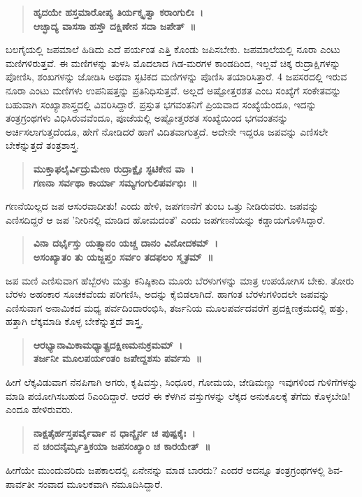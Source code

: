 {\begin{verse}
\textbf{ಹೃದಯೇ ಹಸ್ತಮಾರೋಪ್ಯ ತಿರ್ಯಕ್ಕೃತ್ವಾ ಕರಾಂಗುಲಿಃ~। \\
ಆಚ್ಛಾದ್ಯ ವಾಸಸಾ ಹಸ್ತೌ ದಕ್ಷಿಣೇನ ಸದಾ ಜಪೇತ್~॥}
\end{verse}
ಬಲಗೈಯಲ್ಲಿ ಜಪಮಾಲೆ ಹಿಡಿದು ಎದೆ ಪರ್ಯಂತ ಎತ್ತಿ ಕೊಂಡು ಜಪಿಸಬೇಕು. ಜಪಮಾಲೆಯಲ್ಲಿ ನೂರಾ ಎಂಟು ಮಣಿಗಳಿರುತ್ತವೆ. ಈ ಮಣಿಗಳನ್ನು ತುಳಸಿ ಮೊದಲಾದ ಗಿಡ-ಮರಗಳ ಕಾಂಡದಿಂದ, ಇಲ್ಲವೆ ಚಿಕ್ಕ ರುದ್ರಾಕ್ಷಿಗಳನ್ನು ಪೋಣಿಸಿ, ಶಂಖಗಳನ್ನು ಜೋಡಿಸಿ ಅಥವಾ ಸ್ಫಟಿಕದ ಮಣಿಗಳನ್ನು ಪೊಣಿಸಿ ತಯಾರಿಸಿತ್ತಾರೆ. 4 ಜಪಸರದಲ್ಲಿ ಇರುವ ನೂರಾ ಎಂಟು ಮಣಿಗಳು ಉಪನಿಷತ್ತನ್ನು ಪ್ರತಿನಿಧಿಸುತ್ತವೆ. ಅಲ್ಲದೆ ಅಷ್ಟೋತ್ತರಶತ ಎಂಬ ಸಂಖ್ಯೆಗೆ ಸಂಕೇತವನ್ನು ಬಹುವಾಗಿ ಸಂಖ್ಯಾಶಾಸ್ತ್ರದಲ್ಲಿ ವಿವರಿಸಿದ್ದಾರೆ. ಪ್ರಸ್ತುತ ಭಗವಂತನಿಗೆ ಪ್ರಿಯವಾದ ಸಂಖ್ಯೆಯೆಂದೂ, ಇದನ್ನು ತಂತ್ರಗ್ರಂಥಗಳು ವಿಧಿಸಿರುವವೆಂದೂ, ಪೂಜೆಯಲ್ಲಿ ಅಷ್ಟೋತ್ತರಶತ ಸಂಖ್ಯೆಯಿಂದ ಭಗವಂತನನ್ನು ಅರ್ಚಿಸಲಾಗುತ್ತದೆಂದೂ, ಹೇಗೆ ನೋಡಿದರೆ ಹಾಗೆ ವಿದಿತವಾಗುತ್ತದೆ. ಅದೇನೇ ಇದ್ದರೂ ಜಪವನ್ನು ಎಣಿಸಲೇ ಬೇಕೆನ್ನುತ್ತದೆ ತಂತ್ರಶಾಸ್ತ್ರ.
\begin{verse}
\textbf{ಮುಕ್ತಾಫಲೈರ್ವಿದ್ರುಮೇಣ ರುದ್ರಾಕ್ಷೈಃ ಸ್ಫಟಿಕೇನ ವಾ~। \\
ಗಣನಾ ಸರ್ವಥಾ ಕಾರ್ಯಾ ಸಮ್ಯಗಂಗುಲಿಪರ್ವಭಿಃ~॥}
\end{verse}
ಗಣನೆಯಿಲ್ಲದ ಜಪ ಆಸುರವಾದೀತು! ಎಂದು ಹೇಳಿ, ಜಪಗಣನೆಗೆ ತುಂಬ ಒತ್ತು ನೀಡಿರುವರು. ಜಪವನ್ನು ಎಣಿಸದಿದ್ದರೆ ಆ ಜಪ ’ನೀರಿನಲ್ಲಿ ಮಾಡಿದ ಹೋಮದಂತೆ’ ಎಂದು ಜಪಗಣನೆಯನ್ನು ಕಡ್ಡಾಯಗೊಳಿಸಿದ್ದಾರೆ.
\begin{verse}
\textbf{ವಿನಾ ದರ್ಭೈಸ್ತು ಯತ್ಸ್ನಾನಂ ಯಚ್ಚ ದಾನಂ ವಿನೋದಕಮ್~। \\
ಅಸಂಖ್ಯಾತಂ ತು ಯಜ್ಜಪ್ತಂ ಸರ್ವಂ ತದಫಲಂ ಸ್ಮೃತಮ್~॥}
\end{verse}
ಜಪ ಮಣಿ ಎಣಿಸುವಾಗ ಹೆಬ್ಬೆರಳು ಮತ್ತು ಕನಿಷ್ಠಿಕಾದಿ ಮೂರು ಬೆರಳುಗಳನ್ನು ಮಾತ್ರ ಉಪಯೋಗಿಸ ಬೇಕು. ತೋರು ಬೆರಳು ಅಹಂಕಾರ ಸೂಚಕವೆಂದು ಪರಿಗಣಿಸಿ, ಅದನ್ನು ಕೈಬಿಡಲಾಗಿದೆ. ಹಾಗಂತ ಬೆರಳುಗಳಿಂದಲೇ ಜಪವನ್ನು ಎಣಿಸುವಾಗ ಅನಾಮಿಕದ ಮಧ್ಯ ಪರ್ವದಿಂದಾರಂಭಿಸಿ, ತರ್ಜನಿಯ ಮೂಲಪರ್ವದವರೆಗೆ ಪ್ರದಕ್ಷಿಣಕ್ರಮದಲ್ಲಿ ಹತ್ತು, ಹತ್ತಾಗಿ ಲೆಕ್ಕಮಾಡಿ ಕೊಳ್ಳ ಬೇಕೆನ್ನುತ್ತದೆ ಶಾಸ್ತ್ರ.
\begin{verse}
\textbf{ಆರಭ್ಯಾನಾಮಿಕಾಮಧ್ಯಾತ್ಪ್ರದಕ್ಷಿಣಮನುಕ್ರಮಮ್~। \\
ತರ್ಜನೀ ಮೂಲಪರ್ಯಂತಂ ಜಪೇದ್ದಶಸು ಪರ್ವಸು~॥}
\end{verse}
ಹೀಗೆ ಲೆಕ್ಕವಿಡುವಾಗ ನೆನಪಿಗಾಗಿ ಅಗರು, ಕೃಷಿವಸ್ತು, ಸಿಂಧೂರ, ಗೋಮಯ, ಜೇಡಿಮಣ್ಣು ಇವುಗಳಿಂದ ಗುಳಿಗೆಗಳನ್ನು ಮಾಡಿ ಪಯೋಗಿಸಬಹುದ 5ಎಂದಿದ್ದಾರೆ. ಆದರೆ ಈ ಕೆಳಗಿನ ವಸ್ತುಗಳನ್ನು ಲೆಕ್ಕದ ಅನುಕೂಲಕ್ಕೆ ತೆಗೆದು ಕೊಳ್ಳಬೇಡಿ! ಎಂದೂ ಹೇಳಿರುವರು.
\begin{verse}
\textbf{ನಾಕ್ಷತೈರ್ಹಸ್ತಪರ್ವೈರ್ವಾ ನ ಧಾನ್ಯೈರ್ನ ಚ ಪುಷ್ಪಕೈಃ~। \\
ನ ಚಂದನೈರ್ಮೃತ್ತಿಕಯಾ ಜಪಸಂಖ್ಯಾಂ ಚ ಕಾರಯೇತ್~॥}
\end{verse}
ಹೀಗೆಯೇ ಮುಂದುವರಿದು ಜಪಕಾಲದಲ್ಲಿ ಏನೇನನ್ನು ಮಾಡ ಬಾರದು? ಎಂದರೆ ಅದನ್ನೂ ತಂತ್ರಗ್ರಂಥಗಳಲ್ಲಿ ಶಿವ-ಪಾರ್ವತೀ ಸಂವಾದ ಮೂಲಕವಾಗಿ ನಮೂದಿಸಿದ್ದಾರೆ.
}

